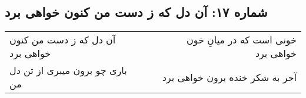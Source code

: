\begin{center}
\section*{شماره ۱۷: آن دل که ز دست من کنون خواهی برد}
\label{sec:017}
\begin{longtable}{l p{0.5cm} r}
آن دل که ز دست من کنون خواهی برد
&&
خونی است که در میانِ خون خواهی برد
\\
باری چو برون میبری از تن دل من
&&
آخر به شکر خنده برون خواهی برد
\\
\end{longtable}
\end{center}
